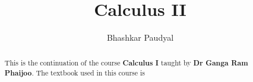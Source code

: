 \documentclass[a4paper, 11pt]{report}
\author{Bhashkar Paudyal}
\title{Calculus II}
\begin{document}
\maketitle
\begin{abstract}
  This is the continuation of the course \textbf{Calculus I} taught by
  \textbf{Dr Ganga Ram Phaijoo}. The textbook used in this course is \cite{1}
\end{abstract}
\newpage
\tableofcontents
\listoftables
\listoftheorems


\newpage
\appendix
\appendixpage{}

\newpage
\pagestyle{plain}
\printbibliography{}
\end{document}
